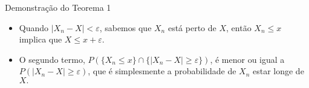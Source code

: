 \documentclass[12pt]{beamer}
\begin{document}
\begin{frame}{}
	\begin{block}{Demonstração do Teorema 1}
	
	
	\begin{itemize}
		\item Quando \( |X_n - X| < \varepsilon \), sabemos que \( X_n \) está perto de \( X \), então \( X_n \leq x \) implica que \( X \leq x + \varepsilon \).	\pause
		\item O segundo termo, \( P(\{X_n \leq x\} \cap \{|X_n - X| \geq \varepsilon\}) \), é menor ou igual a \( P(|X_n - X| \geq \varepsilon) \), que é simplesmente a probabilidade de $X_{n}$ estar longe de $X.$
	\end{itemize}
	\end{block}
\end{frame}


%	

%	
%	
%	
%	
\end{document}
